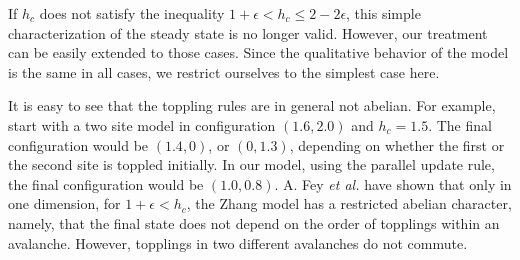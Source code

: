 \documentclass[11pt,a4paper]{book}
\begin{document}
If $ h_c$ does not satisfy the inequality $ 1 + \epsilon  <  h_c \le
2 - 2 \epsilon$,  this simple characterization of the steady state is no 
longer valid. However, our treatment can be easily extended to those 
cases. Since the qualitative behavior of the model is the same in all 
cases, we restrict ourselves to the simplest case here. 


It is easy to see that the toppling rules are in general not abelian. 
For example, start with a two site model in configuration $(1.6,2.0)$ 
and $h_c=1.5$. The final configuration would be $(1.4, 0)$, or $(0, 
1.3)$,  depending on whether the first or the second site is toppled initially.  In our model, 
using the parallel update rule, the final configuration would be 
$( 1.0, 0.8)$.  A. Fey \textit{et al.} \cite{redig} have shown that only 
in one dimension, for $1+\epsilon < h_c$, the Zhang model has a restricted abelian 
character, namely, that the final state does not depend on the order of topplings 
within an avalanche. However, topplings in two different avalanches do 
not commute.
\end{document}
